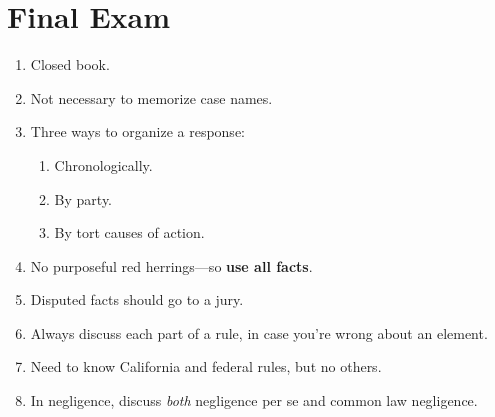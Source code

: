 \section{Final Exam}

\begin{enumerate}
    \item Closed book.
    \item Not necessary to memorize case names.
    \item Three ways to organize a response:
    \begin{enumerate}
        \item Chronologically.
        \item By party.
        \item By tort causes of action.
    \end{enumerate}
    \item No purposeful red herrings---so \textbf{use all facts}.
    \item Disputed facts should go to a jury.
    \item Always discuss each part of a rule, in case you're wrong about an element.
    \item Need to know California and federal rules, but no others.
    \item In negligence, discuss \emph{both} negligence per se and common law negligence.
\end{enumerate}
